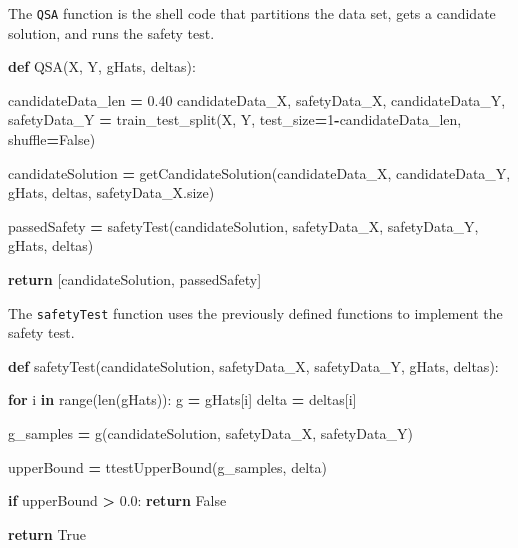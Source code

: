 \documentclass[12pt, twoside]{amherstthesis}
\newenvironment{Shaded}{\begin{snugshade}}{\end{snugshade}}
\newcommand{\BuiltInTok}[1]{#1}
\newcommand{\ControlFlowTok}[1]{\textcolor[rgb]{0.13,0.29,0.53}{\textbf{#1}}}
\newcommand{\DecValTok}[1]{\textcolor[rgb]{0.00,0.00,0.81}{#1}}
\newcommand{\FloatTok}[1]{\textcolor[rgb]{0.00,0.00,0.81}{#1}}
\newcommand{\KeywordTok}[1]{\textcolor[rgb]{0.13,0.29,0.53}{\textbf{#1}}}
\newcommand{\NormalTok}[1]{#1}
\newcommand{\OperatorTok}[1]{\textcolor[rgb]{0.81,0.36,0.00}{\textbf{#1}}}
\newcommand{\VariableTok}[1]{\textcolor[rgb]{0.00,0.00,0.00}{#1}}
\begin{document}
\noindent The \texttt{QSA} function is the shell code that partitions the data set, gets a candidate solution, and runs the safety test.
\begin{Shaded}
\begin{Highlighting}[]
\KeywordTok{def}\NormalTok{ QSA(X, Y, gHats, deltas):}

\NormalTok{    candidateData\_len }\OperatorTok{=} \FloatTok{0.40}
\NormalTok{    candidateData\_X, safetyData\_X, candidateData\_Y, safetyData\_Y }\OperatorTok{=} 
\NormalTok{    train\_test\_split(X, Y, test\_size}\OperatorTok{=}\DecValTok{1}\OperatorTok{{-}}\NormalTok{candidateData\_len, shuffle}\OperatorTok{=}\VariableTok{False}\NormalTok{)}
  
\NormalTok{    candidateSolution }\OperatorTok{=}\NormalTok{ getCandidateSolution(candidateData\_X, candidateData\_Y, }
\NormalTok{    gHats, deltas, safetyData\_X.size)}

\NormalTok{    passedSafety      }\OperatorTok{=}\NormalTok{ safetyTest(candidateSolution, safetyData\_X, }
\NormalTok{    safetyData\_Y, gHats, deltas)}

    \ControlFlowTok{return}\NormalTok{ [candidateSolution, passedSafety]}
\end{Highlighting}
\end{Shaded}
\noindent The \texttt{safetyTest} function uses the previously defined functions to implement the safety test.
\begin{Shaded}
\begin{Highlighting}[]
\KeywordTok{def}\NormalTok{ safetyTest(candidateSolution, safetyData\_X, safetyData\_Y, gHats, deltas):}

    \ControlFlowTok{for}\NormalTok{ i }\KeywordTok{in} \BuiltInTok{range}\NormalTok{(}\BuiltInTok{len}\NormalTok{(gHats)):  }
\NormalTok{        g         }\OperatorTok{=}\NormalTok{ gHats[i]  }
\NormalTok{        delta     }\OperatorTok{=}\NormalTok{ deltas[i] }

    
\NormalTok{        g\_samples }\OperatorTok{=}\NormalTok{ g(candidateSolution, safetyData\_X, safetyData\_Y) }

\NormalTok{        upperBound }\OperatorTok{=}\NormalTok{ ttestUpperBound(g\_samples, delta) }

        \ControlFlowTok{if}\NormalTok{ upperBound }\OperatorTok{\textgreater{}} \FloatTok{0.0}\NormalTok{: }
            \ControlFlowTok{return} \VariableTok{False}

    \ControlFlowTok{return} \VariableTok{True}
\end{Highlighting}
\end{Shaded}
\end{document}
